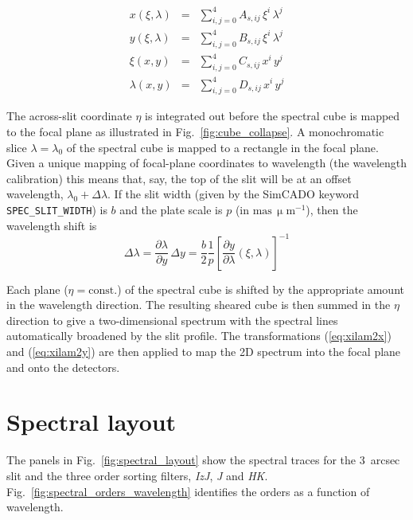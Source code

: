 \documentclass[a4paper,twoside,11pt]{article}
\newcommand{\micron}{\upmu\mathrm{m}}
\begin{document}
\begin{eqnarray}
  x(\xi, \lambda) &=& \sum_{i,j=0}^{4} A_{s,ij}\,\xi^{i}\,\lambda^{j} \label{eq:xilam2x} \\
  y(\xi, \lambda) &=& \sum_{i,j=0}^{4} B_{s,ij}\,\xi^{i}\,\lambda^{j} \label{eq:xilam2y} \\
  \xi(x, y)     &=& \sum_{i,j=0}^{4} C_{s,ij}\,x^{i}\,y^{j} \label{eq:xy2xi} \\
  \lambda(x, y) &=& \sum_{i,j=0}^{4} D_{s,ij}\,x^{i}\,y^{j} \label{eq:xy2lam}
\end{eqnarray}

The across-slit coordinate $\eta$ is integrated out before the
spectral cube is mapped to the focal plane as illustrated in
Fig.~\ref{fig:cube_collapse}. A monochromatic slice
$\lambda=\lambda_{0}$ of the spectral cube is mapped to a rectangle in
the focal plane. Given a unique mapping of focal-plane coordinates to
wavelength (the wavelength calibration) this means that, say, the top
of the slit will be at an offset wavelength,
$\lambda_{0}+\Delta\lambda$. If the slit width (given by the SimCADO
keyword \lstinline{SPEC_SLIT_WIDTH}) is $b$ and the plate scale is $p$
(in $\mathrm{mas}\,\micron^{-1}$), then the wavelength shift is
\begin{equation}
  \Delta\lambda = \frac{\partial\lambda}{\partial y}\,\Delta y
  = \frac{b}{2}\frac{1}{p} \left[\frac{\partial y}{\partial
      \lambda}(\xi, \lambda)\right]^{-1}
\end{equation}

Each plane ($\eta = \mathrm{const.}$) of the spectral cube is shifted
by the appropriate amount in the wavelength direction. The resulting
sheared cube is then summed in the $\eta$ direction to give a
two-dimensional spectrum with the spectral lines automatically
broadened by the slit profile. The transformations (\ref{eq:xilam2x})
and (\ref{eq:xilam2y}) are then applied to map the 2D spectrum into
the focal plane and onto the detectors.


\section{Spectral layout}
\label{sec:spectral_layout}

The panels in Fig.~\ref{fig:spectral_layout} show the spectral traces
for the 3~arcsec slit and the three order sorting filters,
\textit{IzJ}, \textit{J} and
\textit{HK}. Fig.~\ref{fig:spectral_orders_wavelength} identifies the
orders as a function of wavelength.
\end{document}
